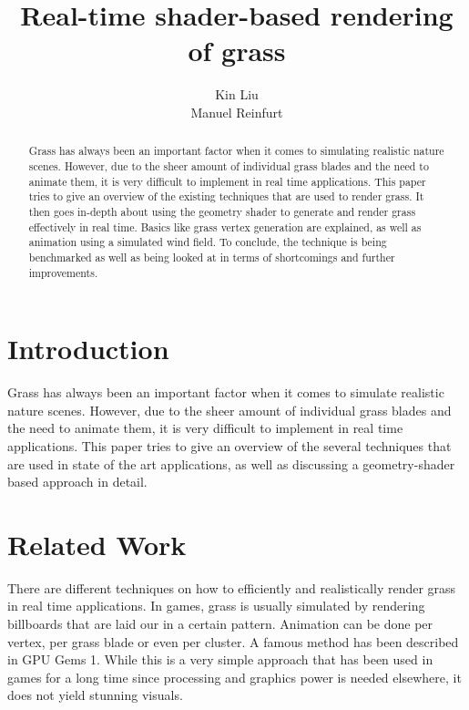\documentclass[conference]{acmsiggraph}
\title{Real-time shader-based rendering of grass}
\author {Kin Liu\\Manuel Reinfurt}
\begin{document}

\maketitle

\begin{abstract}

Grass has always been an important factor when it comes to simulating realistic nature scenes. However, due to the sheer amount of individual grass blades and the need to animate them, it is very difficult to implement in real time applications. This paper tries to give an overview of the existing techniques that are used to render grass. It then goes in-depth about using the geometry shader to generate and render grass effectively in real time. Basics like grass vertex generation are explained, as well as animation using a simulated wind field. To conclude, the technique is being benchmarked as well as being looked at in terms of shortcomings and further improvements.

\end{abstract}

\TOGlinkslist


\copyrightspace

\section{Introduction}

Grass has always been an important factor when it comes to simulate realistic nature scenes. However, due to the sheer amount of individual grass blades and the need to animate them, it is very difficult to implement in real time applications. This paper tries to give an overview of the several techniques that are used in state of the art applications, as well as discussing a geometry-shader based approach in detail.

\section{Related Work}

There are different techniques on how to efficiently and realistically render grass in real time applications. In games, grass is usually simulated by rendering billboards that are laid our in a certain pattern. Animation can be done per vertex, per grass blade or even per cluster. A famous method has been described in GPU Gems 1. While this is a very simple approach that has been used in games for a long time since processing and graphics power is needed elsewhere, it does not yield stunning visuals.
\end{document}
